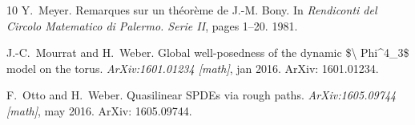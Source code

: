 \documentclass[11pt,reqno]{amsart}
\newcommand{\tmtextit}[1]{{\itshape{#1}}}
\begin{document}
\begin{thebibliography}{10}
  Y.~Meyer.{\newblock} Remarques sur un
  th{\'e}or{\`e}me de J.-M. Bony.{\newblock} In \tmtextit{Rendiconti del
  Circolo Matematico di Palermo. Serie II},  pages  1--20. 1981.{\newblock}
  
  J.-C.~Mourrat  and  H.~Weber.{\newblock}
  Global well-posedness of the dynamic \$\textbackslash
  Phi{\textasciicircum}4\_3\$ model on the torus.{\newblock}
  \tmtextit{ArXiv:1601.01234 [math]}, jan 2016.{\newblock} ArXiv:
  1601.01234.{\newblock}
  
  F.~Otto  and  H.~Weber.{\newblock}
  Quasilinear SPDEs via rough paths.{\newblock} \tmtextit{ArXiv:1605.09744
  [math]}, may 2016.{\newblock} ArXiv: 1605.09744.{\newblock}
\end{thebibliography}
\end{document}
